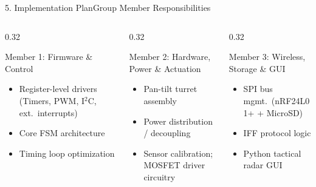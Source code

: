 \documentclass[aspectratio=169, 10pt]{beamer}
\begin{document}
\begin{frame}{5. Implementation Plan}{Group Member Responsibilities}
    \begin{columns}[T]
        \begin{column}{0.32\textwidth}
            \begin{block}{Member 1: Firmware \& Control}
                \small
                \begin{itemize}
                    \item Register-level drivers (Timers, PWM, I$^2$C, ext.\ interrupts)
                    \item Core FSM architecture
                    \item Timing loop optimization
                \end{itemize}
            \end{block}
        \end{column}
        \begin{column}{0.32\textwidth}
            \begin{block}{Member 2: Hardware, Power \& Actuation}
                \small
                \begin{itemize}
                    \item Pan-tilt turret assembly
                    \item Power distribution / decoupling
                    \item Sensor calibration; MOSFET driver circuitry
                \end{itemize}
            \end{block}
        \end{column}
        \begin{column}{0.32\textwidth}
            \begin{block}{Member 3: Wireless, Storage \& GUI}
                \small
                \begin{itemize}
                    \item SPI bus mgmt.\ (nRF24L01+ + MicroSD)
                    \item IFF protocol logic
                    \item Python tactical radar GUI
                \end{itemize}
            \end{block}
        \end{column}
    \end{columns}
\end{frame}
\end{document}
